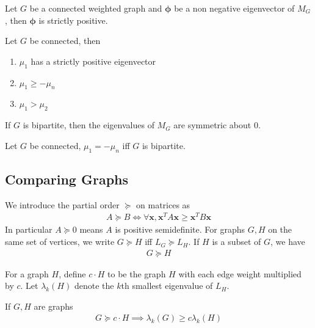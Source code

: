 \documentclass{math}
\renewcommand{\vec}[1]{\boldsymbol{#1}}
\begin{document}
\begin{lemma}
    Let $G$ be a connected weighted graph and $\vec{\phi}$ be a non negative eigenvector of $M_G$, then $\vec{\phi}$ is strictly positive.
\end{lemma}

\begin{theorem}
    Let $G$ be connected, then
    \begin{enumerate}
        \item $\mu_1$ has a strictly positive eigenvector
        \item $\mu_1 \geq - \mu_n$
        \item $\mu_1 > \mu_2$
    \end{enumerate}
\end{theorem}

\begin{lemma}
    If $G$ is bipartite, then the eigenvalues of $M_G$ are symmetric about $0$.
\end{lemma}

\begin{theorem}
    Let $G$ be connected, $\mu_1 = - \mu_n$ iff $G$ is bipartite.
\end{theorem}

\subsection{Comparing Graphs}

We introduce the partial order $\succeq$ on matrices as
\begin{align*}
    A \succeq B \iff \forall \vec{x}, \vec{x}^T A \vec{x} \geq \vec{x}^T B \vec{x}
\end{align*}
In particular $A \succeq 0$ means $A$ is positive semidefinite.
For graphs $G, H$ on the same set of vertices, we write $G \succeq H$ iff $L_G \succeq L_H$.
If $H$ is a subset of $G$, we have
\begin{align*}
    G \succeq H
\end{align*}

For a graph $H$, define $c \cdot H$ to be the graph $H$ with each edge weight multiplied by $c$.
Let $\lambda_k(H)$ denote the $k$th smallest eigenvalue of $L_H$.
\begin{lemma}
    If $G, H$ are graphs
    \begin{align*}
        G \succeq c \cdot H \implies \lambda_k(G) \geq c \lambda_k(H)
    \end{align*}
\end{lemma}
\end{document}
